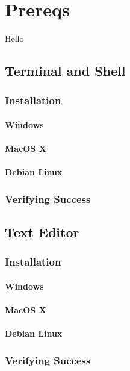 \chapter{Prereqs}

Hello

\section{Terminal and Shell}

\subsection{Installation}
\subsubsection{Windows}
\subsubsection{MacOS X}
\subsubsection{Debian Linux}
\subsection{Verifying Success}

\section{Text Editor}

\subsection{Installation}
\subsubsection{Windows}
\subsubsection{MacOS X}
\subsubsection{Debian Linux}
\subsection{Verifying Success}

